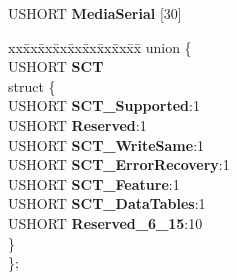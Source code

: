 \begin{DoxyCompactItemize}
U\+S\+H\+O\+RT {\bfseries Media\+Serial} \mbox{[}30\mbox{]}
\item 
\mbox{\label{struct___i_d_e_n_t_i_f_y___d_a_t_a_ab4d66b9d8a37ce435aa41daebb467ab6}} 
\begin{tabbing}
xx\=xx\=xx\=xx\=xx\=xx\=xx\=xx\=xx\=\kill
union \{\\
\>USHORT {\bfseries SCT}\\
\mbox{\label{union___i_d_e_n_t_i_f_y___d_a_t_a_1_1_0D967_a47da865309e4a3b4bb4b316a96edce97}} 
\>struct \{\\
\>\>USHORT {\bfseries SCT\_Supported}:1\\
\>\>USHORT {\bfseries Reserved}:1\\
\>\>USHORT {\bfseries SCT\_WriteSame}:1\\
\>\>USHORT {\bfseries SCT\_ErrorRecovery}:1\\
\>\>USHORT {\bfseries SCT\_Feature}:1\\
\>\>USHORT {\bfseries SCT\_DataTables}:1\\
\>\>USHORT {\bfseries Reserved\_6\_15}:10\\
\>\} \\
\}; \\


\end{tabbing}
\end{DoxyCompactItemize}
